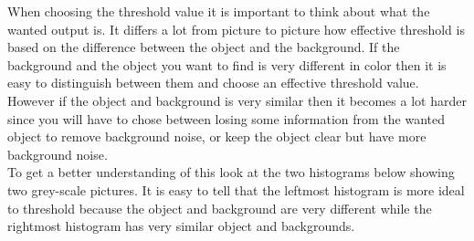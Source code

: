 When choosing the threshold value it is important to think about what the wanted output is. It differs a lot from picture to picture how effective threshold is based on the difference between the object and the background. If the background and the object you want to find is very different in color then it is easy to distinguish between them and choose an effective threshold value. However if the object and background is very similar then it becomes a lot harder since you will have to chose between losing some information from the wanted object to remove background noise, or keep the object clear but have more background noise. \\
To get a better understanding of this look at the two histograms below showing two grey-scale pictures. It is easy to tell that the leftmost histogram is more ideal to threshold because the object and background are very different while the rightmost histogram has very similar object and backgrounds.

